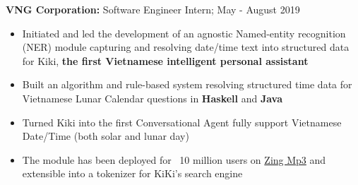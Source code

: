 \documentclass[a4paper,11pt]{article}
\begin{document}
\begin{flushleft}
	
	\textbf{VNG Corporation: }Software Engineer Intern; May - August 2019 \\
	\vspace{-\topsep}
	\begin{itemize}
		\setlength{\parskip}{2pt}
		\setlength{\itemsep}{0pt plus 1pt}
		\item Initiated and led the development of an agnostic Named-entity recognition (NER) module capturing and resolving date/time text into structured data for Kiki, \textbf{the first Vietnamese intelligent personal assistant}
		\item Built an algorithm and rule-based system resolving structured time data for Vietnamese Lunar Calendar questions in \textbf{Haskell} and \textbf{Java}  
		\item Turned Kiki into the first Conversational Agent fully support Vietnamese Date/Time (both solar and lunar day) 
		\item  The module has been deployed for ~10 million users on \href{https://mp3.zing.vn/}{Zing Mp3} and extensible into a tokenizer for KiKi's search engine
	\end{itemize}
\vspace{-\topsep}
\centering{\noindent\makebox{\rule{8cm}{1.5pt}}}
\end{flushleft} 
\end{document}
